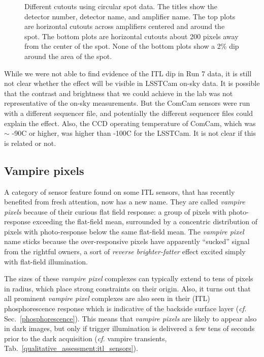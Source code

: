 \begin{figure}[ht]
\caption{Different cutouts using circular spot data. The titles show the detector number, detector name, and amplifier name. The top plots are horizontal cutouts across amplifiers centered and around the spot. The bottom plots are horizontal cutouts about 200 pixels away from the center of the spot. None of the bottom plots show a 2\% dip around the area of the spot.}
\label{fig:ITLDip_Spots}
\end{figure}

While we were not able to find evidence of the ITL dip in Run 7 data, it
is still not clear whether the effect will be visible in LSSTCam on-sky data. It is possible that the contrast and brightness that we could achieve in the lab was not representative of the on-sky measurements. But the ComCam sensors were run with a different sequencer file, and potentially the different sequencer files could explain the effect. Also, the CCD operating temperature of ComCam, which was $\sim$ -90C or higher, was higher than -100C for the LSSTCam. It is not clear if this is related or not.


\subsection{Vampire pixels}\label{vampire-pixels}

A category of sensor feature found on some ITL sensors, that has recently benefited from fresh attention, now has a new name. They are called {\it vampire pixels} because of their curious flat field response: a group of pixels with photo-response exceeding the flat-field mean, surrounded by a concentric distribution of pixels with photo-response below the same flat-field mean. The {\it vampire pixel} name sticks because the over-responsive pixels have apparently ``sucked'' signal from the rightful owners, a sort of {\it reverse brighter-fatter} effect excited simply with flat-field illumination. 

The sizes of these {\it vampire pixel} complexes can typically extend to tens of pixels in radius, which place strong constraints on their origin. Also, it turns out that all prominent {\it vampire pixel} complexes are also seen in their (ITL) phosphorescence response which is indicative of the backside surface layer ({\it cf.} Sec.~\ref{phosphorescence}). This means that {\it vampire pixels} are likely to appear also in dark images, but only if trigger illumination is delivered a few tens of seconds prior to the dark acquisition ({\it cf.} vampire transients, Tab.~\ref{qualitative_assessment:itl_sensors}).

